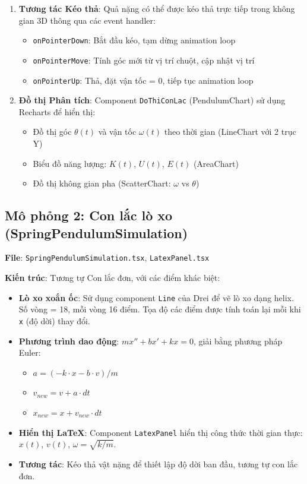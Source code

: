 \begin{enumerate}
    \item \textbf{Tương tác Kéo thả}: Quả nặng có thể được kéo thả trực tiếp trong không gian 3D thông qua các event handler:
    \begin{itemize}
        \item \texttt{onPointerDown}: Bắt đầu kéo, tạm dừng animation loop
        \item \texttt{onPointerMove}: Tính góc mới từ vị trí chuột, cập nhật vị trí
        \item \texttt{onPointerUp}: Thả, đặt vận tốc = 0, tiếp tục animation loop
    \end{itemize}
    
    \item \textbf{Đồ thị Phân tích}: Component \texttt{DoThiConLac} (PendulumChart) sử dụng Recharts để hiển thị:
    \begin{itemize}
        \item Đồ thị góc $\theta(t)$ và vận tốc $\omega(t)$ theo thời gian (LineChart với 2 trục Y)
        \item Biểu đồ năng lượng: $K(t)$, $U(t)$, $E(t)$ (AreaChart)
        \item Đồ thị không gian pha (ScatterChart: $\omega$ vs $\theta$)
    \end{itemize}
\end{enumerate}

\subsection{Mô phỏng 2: Con lắc lò xo (SpringPendulumSimulation)}

\textbf{File}: \texttt{SpringPendulumSimulation.tsx}, \texttt{LatexPanel.tsx}

\textbf{Kiến trúc}: Tương tự Con lắc đơn, với các điểm khác biệt:

\begin{itemize}
    \item \textbf{Lò xo xoắn ốc}: Sử dụng component \texttt{Line} của Drei để vẽ lò xo dạng helix. Số vòng = 18, mỗi vòng 16 điểm. Tọa độ các điểm được tính toán lại mỗi khi \texttt{x} (độ dời) thay đổi.
    
    \item \textbf{Phương trình dao động}: $mx'' + bx' + kx = 0$, giải bằng phương pháp Euler:
    \begin{itemize}
        \item $a = (-k \cdot x - b \cdot v) / m$
        \item $v_{new} = v + a \cdot dt$
        \item $x_{new} = x + v_{new} \cdot dt$
    \end{itemize}
    
    \item \textbf{Hiển thị LaTeX}: Component \texttt{LatexPanel} hiển thị công thức thời gian thực: $x(t)$, $v(t)$, $\omega = \sqrt{k/m}$.
    
    \item \textbf{Tương tác}: Kéo thả vật nặng để thiết lập độ dời ban đầu, tương tự con lắc đơn.
\end{itemize}

